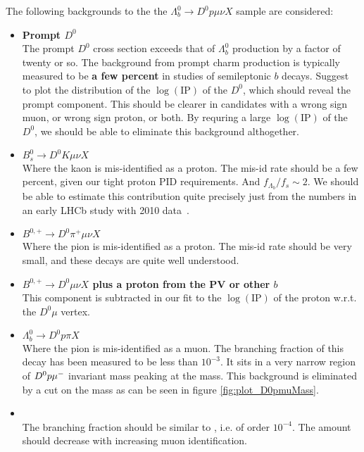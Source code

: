 The following backgrounds to the the $\Lambda_b^0 \rightarrow D^0 p \mu \nu X$ sample are considered:


\begin{itemize}
\item {\bf Prompt $D^{0}$}\\
The prompt $D^0$ cross section exceeds that of $\Lambda_b^0$ production by a factor of twenty or so.
The background from prompt charm production is typically measured to be {\bf a few percent} in studies of semileptonic $b$ decays.
Suggest to plot the distribution of the $\log(\mathrm{IP})$ of the $D^0$, which should reveal the prompt component.
This should be clearer in candidates with a wrong sign muon, or wrong sign proton, or both.
By requring a large $\log(\mathrm{IP})$ of the $D^0$, we should be able to eliminate this background althogether.
\item {\bf $B_s^{0} \rightarrow D^0 K \mu \nu X$}\\
Where the kaon is mis-identified as a proton. The mis-id rate should be a few percent, given
our tight proton PID requirements. And $f_{\Lambda_b}/f_s \sim 2$.
We should be able to estimate this contribution quite precisely just from the numbers in an early LHCb
study with 2010 data~\cite{Aaij:2011ju}.
\item {\bf $B^{0,+} \rightarrow D^0 \pi^+ \mu \nu X$}\\
Where the pion is mis-identified as a proton. The mis-id rate should be very small,
and these decays are quite well understood.
\item {\bf $B^{0,+} \rightarrow D^0 \mu \nu X$ plus a proton from the PV or other $b$}\\
This component is subtracted in our fit to the $\log(\mathrm{IP})$ of the proton w.r.t. the $D^0\mu$ vertex.
\item {\bf $\Lambda_b^0 \rightarrow D^0 p \pi X$}\\
      Where the pion is mis-identified as a muon. 
      The branching fraction of this decay has been measured to be less than $10^{-3}$. It sits in a very narrow region of ${{D}^0}{p}{\mu^-}$ invariant mass peaking at the \Lb mass. 
      This background is eliminated by a cut on the \Dz\proton\mun mass as can be seen in figure \ref{fig:plot_D0pmuMass}.
\item {\bf \decay{\Lb}{\Dz\proton 3\pi}} \\
      The branching fraction should be similar to , i.e. of order $10^{-4}$. 
      The amount should decrease with increasing muon identification. 

\end{itemize}
